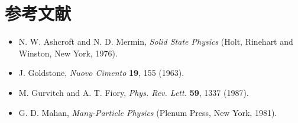 \section*{参考文献}

\begin{itemize}[leftmargin=2em,itemsep=0pt,parsep=0pt,label={}]
\item [AM1976] N. W. Ashcroft and N. D. Mermin, \emph{Solid State Physics} (Holt, Rinehart and Winston, New York, 1976).
\item [G1963] J. Goldstone, \emph{Nuovo Cimento} \textbf{19}, 155 (1963).
\item [GF1987] M. Gurvitch and A. T. Fiory, \emph{Phys. Rev. Lett.} \textbf{59}, 1337 (1987).
\item [M1981] G. D. Mahan, \emph{Many-Particle Physics} (Plenum Press, New York, 1981).
\end{itemize}
